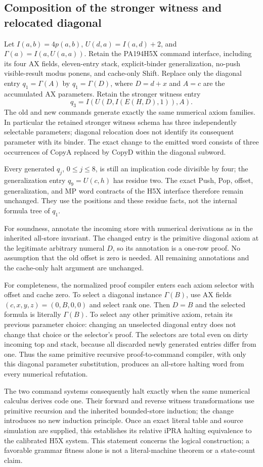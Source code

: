 \subsection{Composition of the stronger witness and relocated diagonal}
Let $I(a,b)=4p(a,b)$, $U(d,a)=I(a,d)+2$, and
$\Gamma(a)=I(a,U(a,a))$. Retain the PA194H5X command interface, including
its four AX fields, eleven-entry stack, explicit-binder generalization,
no-push visible-result modus ponens, and cache-only Shift.
Replace only the diagonal entry $q_1=\Gamma(A)$ by
$q_1=\Gamma(D)$, where $D=d+x$ and $A=c$ are the accumulated AX parameters.
Retain the stronger witness entry
\[
q_3=I(U(D,I(E(H,D),1)),A).
\]
The old and new commands generate exactly the same numerical axiom families.
In particular the retained stronger witness schema has three independently
selectable parameters; diagonal relocation does not identify its consequent
parameter with its binder. The exact change to the emitted word consists of
three occurrences of CopyA replaced by CopyD within the diagonal subword.

Every generated $q_j$, $0\leq j\leq8$, is still an implication code divisible
by four; the generalization entry $q_9=U(c,h)$ has residue two. The exact
Push, Pop, offset, generalization, and MP word contracts of the H5X interface
therefore remain unchanged. They use the positions and these residue facts,
not the internal formula tree of $q_1$.

For soundness, annotate the incoming store with numerical derivations as in
the inherited all-store invariant. The changed entry is the primitive
diagonal axiom at the legitimate arbitrary numeral $D$, so its annotation
is a one-row proof. No assumption that the old offset is zero is needed.
All remaining annotations and the cache-only halt argument are unchanged.

For completeness, the normalized proof compiler enters each axiom selector
with offset and cache zero. To select a diagonal instance $\Gamma(B)$, use
AX fields $(c,x,y,z)=(0,B,0,0)$ and select rank one. Then $D=B$ and the
selected formula is literally $\Gamma(B)$. To select any other primitive
axiom, retain its previous parameter choice: changing an unselected diagonal
entry does not change that choice or the selector's proof. The selectors
are total even on dirty incoming top and stack, because all discarded
newly generated entries differ from one. Thus the same primitive recursive
proof-to-command compiler, with only this diagonal parameter substitution,
produces an all-store halting word from every numerical refutation.

The two command systems consequently halt exactly when the same numerical
calculus derives code one. Their forward and reverse witness transformations
use primitive recursion and the inherited bounded-store induction; the
change introduces no new induction principle. Once an exact literal table
and source simulation are supplied, this establishes its relative iPRA
halting equivalence to the calibrated H5X system. This statement concerns
the logical construction; a favorable grammar fitness alone is not a
literal-machine theorem or a state-count claim.
